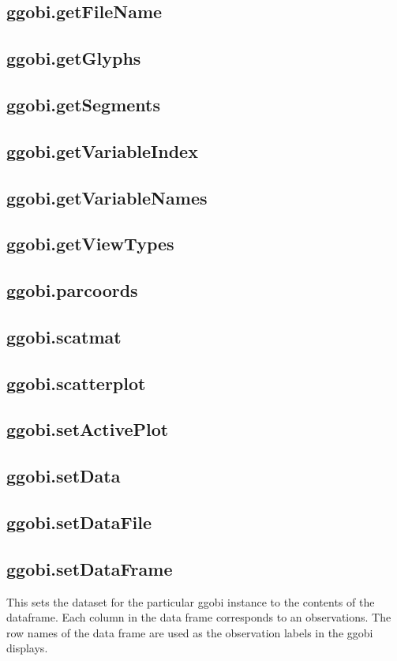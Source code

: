 \documentclass{article}
\begin{document}
\subsection{ggobi.getFileName}
\subsection{ggobi.getGlyphs}
\subsection{ggobi.getSegments}
\subsection{ggobi.getVariableIndex}
\subsection{ggobi.getVariableNames}
\subsection{ggobi.getViewTypes}
\subsection{ggobi.parcoords}
\subsection{ggobi.scatmat}
\subsection{ggobi.scatterplot}
\subsection{ggobi.setActivePlot}
\subsection{ggobi.setData}
\subsection{ggobi.setDataFile}
\subsection{ggobi.setDataFrame}
This sets the dataset for the particular ggobi instance to the
contents of the dataframe.  Each column in the data frame corresponds
to an observations. The row names of the data frame are used as the
observation labels in the ggobi displays.
\end{document}
